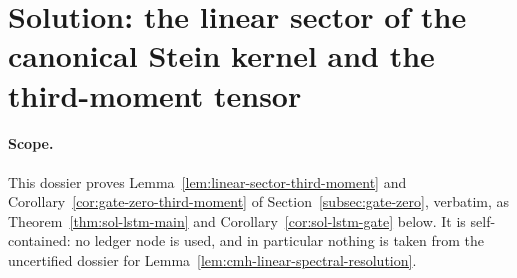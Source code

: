 \documentclass[../main.tex]{subfiles}
\begin{document}
%
%
%
%
%
%

\section*{Solution: the linear sector of the canonical Stein kernel and the third-moment
tensor}
\label{sec:sol-lstm}

\paragraph{Scope.}
This dossier proves Lemma~\ref{lem:linear-sector-third-moment} and
Corollary~\ref{cor:gate-zero-third-moment} of Section~\ref{subsec:gate-zero}, verbatim, as
Theorem~\ref{thm:sol-lstm-main} and Corollary~\ref{cor:sol-lstm-gate} below.  It is
self-contained: no ledger node is used, and in particular nothing is taken from the
uncertified dossier for Lemma~\ref{lem:cmh-linear-spectral-resolution}.
\end{document}
